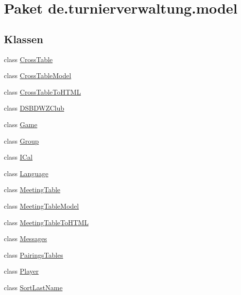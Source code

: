 \hypertarget{namespacede_1_1turnierverwaltung_1_1model}{}\section{Paket de.\+turnierverwaltung.\+model}
\label{namespacede_1_1turnierverwaltung_1_1model}
\subsection*{Klassen}
\begin{DoxyCompactItemize}
\item 
class \hyperlink{classde_1_1turnierverwaltung_1_1model_1_1_cross_table}{Cross\+Table}
\item 
class \hyperlink{classde_1_1turnierverwaltung_1_1model_1_1_cross_table_model}{Cross\+Table\+Model}
\item 
class \hyperlink{classde_1_1turnierverwaltung_1_1model_1_1_cross_table_to_h_t_m_l}{Cross\+Table\+To\+H\+T\+ML}
\item 
class \hyperlink{classde_1_1turnierverwaltung_1_1model_1_1_d_s_b_d_w_z_club}{D\+S\+B\+D\+W\+Z\+Club}
\item 
class \hyperlink{classde_1_1turnierverwaltung_1_1model_1_1_game}{Game}
\item 
class \hyperlink{classde_1_1turnierverwaltung_1_1model_1_1_group}{Group}
\item 
class \hyperlink{classde_1_1turnierverwaltung_1_1model_1_1_i_cal}{I\+Cal}
\item 
class \hyperlink{classde_1_1turnierverwaltung_1_1model_1_1_language}{Language}
\item 
class \hyperlink{classde_1_1turnierverwaltung_1_1model_1_1_meeting_table}{Meeting\+Table}
\item 
class \hyperlink{classde_1_1turnierverwaltung_1_1model_1_1_meeting_table_model}{Meeting\+Table\+Model}
\item 
class \hyperlink{classde_1_1turnierverwaltung_1_1model_1_1_meeting_table_to_h_t_m_l}{Meeting\+Table\+To\+H\+T\+ML}
\item 
class \hyperlink{classde_1_1turnierverwaltung_1_1model_1_1_messages}{Messages}
\item 
class \hyperlink{classde_1_1turnierverwaltung_1_1model_1_1_pairings_tables}{Pairings\+Tables}
\item 
class \hyperlink{classde_1_1turnierverwaltung_1_1model_1_1_player}{Player}
\item 
class \hyperlink{classde_1_1turnierverwaltung_1_1model_1_1_sort_last_name}{Sort\+Last\+Name}

\end{DoxyCompactItemize}
